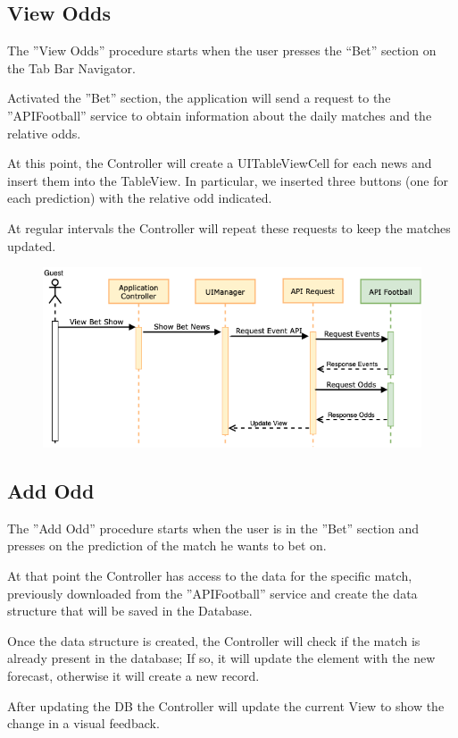 \documentclass[numbers=noenddot, 12pt, a4paper, oneside]{scrbook}
\begin{document}
\newpage
\subsection*{View Odds}
The ”View Odds” procedure starts when the user presses the “Bet” section on the Tab Bar Navigator.

Activated the ”Bet” section, the application will send a request to the ”APIFootball” service to obtain information about the daily matches and the relative odds.

At this point, the Controller will create a UITableViewCell for each news and insert them into the TableView. In particular, we inserted three buttons (one for each prediction) with the relative odd indicated.

At regular intervals the Controller will repeat these requests to keep the matches updated.
\begin{figure}[H]
	\centering
	\includegraphics[width=1\textwidth]{images/Sequence/SequenceOdds}
\end{figure}

\newpage
\subsection*{Add Odd}
The ”Add Odd” procedure starts when the user is in the ”Bet” section and presses on  the prediction of the match he wants to bet on.

At that point the Controller has access to the data for the specific match, previously downloaded from the ”APIFootball” service and create the data structure that will be saved in the Database.

Once the data structure is created, the Controller will check if the match is already present in the database; If so, it will update the element with the new forecast, otherwise it will create a new record.

After updating the DB the Controller will update the current View to show the change in a visual feedback.
\end{document}
